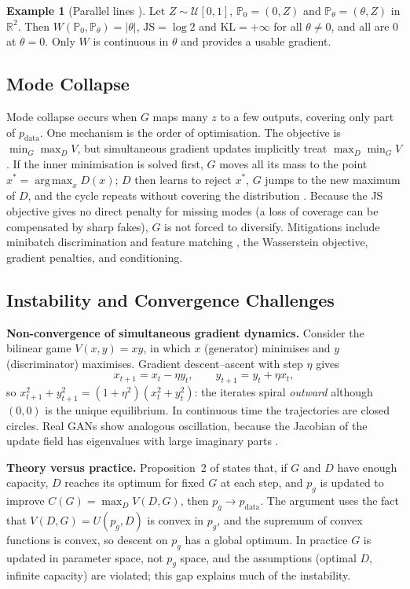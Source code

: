 \documentclass[conference]{IEEEtran}
\newcommand{\pdata}{p_{\mathrm{data}}}
\newcommand{\pg}{p_{g}}
\newcommand{\JS}{\mathrm{JS}}
\newcommand{\KL}{\mathrm{KL}}
\DeclareMathOperator*{\argmax}{arg\,max}
\theoremstyle{plain}
\theoremstyle{definition}
\newtheorem{example}{Example}
\begin{document}
\begin{example}[Parallel lines \cite{arjovsky2017wgan}]
Let $Z\sim\mathcal{U}[0,1]$, $\mathbb{P}_0=(0,Z)$ and $\mathbb{P}_\theta=(\theta,Z)$ in $\mathbb{R}^2$. Then $W(\mathbb{P}_0,\mathbb{P}_\theta)=|\theta|$, $\JS=\log2$ and $\KL=+\infty$ for all $\theta\neq0$, and all are $0$ at $\theta=0$. Only $W$ is continuous in $\theta$ and provides a usable gradient.
\end{example}

\subsection{Mode Collapse}
Mode collapse occurs when $G$ maps many $z$ to a few outputs, covering only part of $\pdata$. One mechanism is the order of optimisation. The objective is $\min_G\max_D V$, but simultaneous gradient updates implicitly treat $\max_D\min_G V$. If the inner minimisation is solved first, $G$ moves all its mass to the point $x^*=\argmax_x D(x)$; $D$ then learns to reject $x^*$, $G$ jumps to the new maximum of $D$, and the cycle repeats without covering the distribution \cite{goodfellow2014gan,goodfellow2016tutorial}. Because the JS objective gives no direct penalty for missing modes (a loss of coverage can be compensated by sharp fakes), $G$ is not forced to diversify. Mitigations include minibatch discrimination and feature matching \cite{salimans2016improved}, the Wasserstein objective, gradient penalties, and conditioning.

\subsection{Instability and Convergence Challenges}
\textbf{Non-convergence of simultaneous gradient dynamics.} Consider the bilinear game $V(x,y)=xy$, in which $x$ (generator) minimises and $y$ (discriminator) maximises. Gradient descent--ascent with step $\eta$ gives
\begin{equation}
x_{t+1}=x_t-\eta y_t,\qquad y_{t+1}=y_t+\eta x_t,
\end{equation}
so $x_{t+1}^2+y_{t+1}^2=(1+\eta^2)(x_t^2+y_t^2)$: the iterates spiral \emph{outward} although $(0,0)$ is the unique equilibrium. In continuous time the trajectories are closed circles. Real GANs show analogous oscillation, because the Jacobian of the update field has eigenvalues with large imaginary parts \cite{mescheder2018converge}.

\textbf{Theory versus practice.} Proposition~2 of \cite{goodfellow2014gan} states that, if $G$ and $D$ have enough capacity, $D$ reaches its optimum for fixed $G$ at each step, and $\pg$ is updated to improve $C(G)=\max_D V(D,G)$, then $\pg\to\pdata$. The argument uses the fact that $V(D,G)=U(\pg,D)$ is convex in $\pg$, and the supremum of convex functions is convex, so descent on $\pg$ has a global optimum. In practice $G$ is updated in parameter space, not $\pg$ space, and the assumptions (optimal $D$, infinite capacity) are violated; this gap explains much of the instability.
\end{document}
